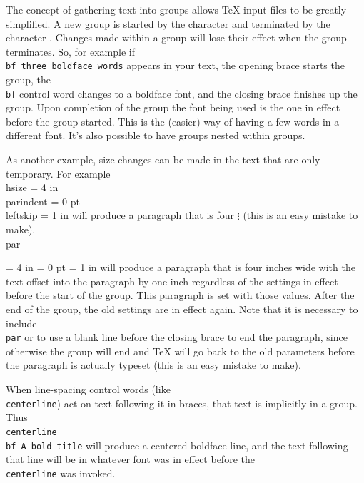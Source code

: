 The concept of gathering text into groups allows \TeX{} input 
files to be greatly simplified.  A new group is started by the 
character {\tt\lb} and terminated by the character {\tt \rb}\null. 
Changes made within a group will lose their effect when the 
group terminates.  So, for example if {\tt \lb \\bf three 
boldface words\rb} appears in your text, the opening brace starts 
the group, the {\tt \\bf} control word changes to a boldface 
font, and the closing brace finishes up the group.  Upon 
completion of the group the font being used is the one in effect 
before the group started.  This is the (easier) way of having a 
few words in a different font.  It's also possible to have groups 
nested within groups. 


As another example, size changes can be made in the text that are 
only temporary.  For example 
\beginuser 
\lb 
\\hsize = 4 in 
\\parindent = 0 pt 
\\leftskip = 1 in 
will produce a paragraph that is four 
$\vdots$ 
(this is an easy mistake to make). 
\\par 
\rb 
\enduser 

{\hsize = 4 in 
\parindent = 0 pt 
\leftskip = 1 in 
will produce a paragraph that is four inches wide with the text 
offset into the paragraph by one inch regardless of the settings 
in effect before the start of the group.  This paragraph is set 
with those values. After the end of the group, the old settings 
are in effect again. Note that it is necessary to include 
{\tt \\par} or to use a blank line before the closing brace to end 
the paragraph, since otherwise the group will end and \TeX{} will 
go back to the old parameters before the paragraph is actually 
typeset (this is an easy mistake to make). \par} 

When line-spacing control words (like {\tt \\centerline}) act on text 
following it in braces, that text is implicitly in a group. Thus 
{\tt \\centerline\lb\\bf A bold title\rb} will produce a centered{} 
boldface line, and the text following that line will be in 
whatever font was in effect before the {\tt \\centerline} was 
invoked. 


